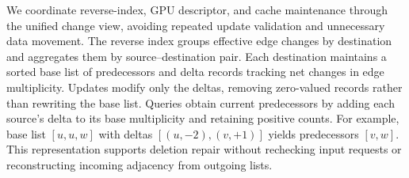 




We coordinate reverse-index, GPU descriptor, and cache maintenance through the unified change view, avoiding repeated update validation and unnecessary data movement. The reverse index groups effective edge changes by destination and aggregates them by source--destination pair. Each destination maintains a sorted base list of predecessors and delta records tracking net changes in edge multiplicity. Updates modify only the deltas, removing zero-valued records rather than rewriting the base list. Queries obtain current predecessors by adding each source's delta to its base multiplicity and retaining positive counts. For example, base list $[u,u,w]$ with deltas $[(u,-2),(v,+1)]$ yields predecessors $[v,w]$. This representation supports deletion repair without rechecking input requests or reconstructing incoming adjacency from outgoing lists.

